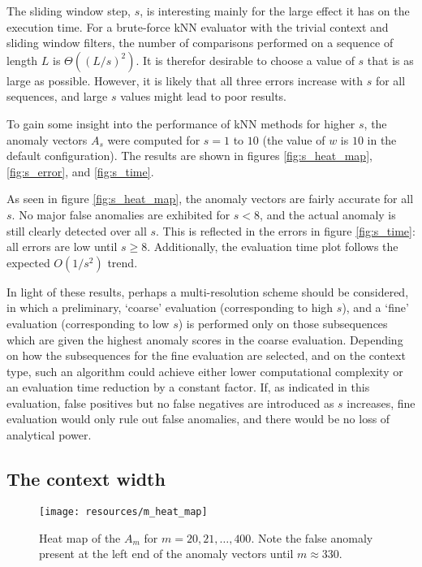 The sliding window step, $s$, is interesting mainly for the large effect it has on the execution time. For a brute-force kNN evaluator with the trivial context and sliding window filters, the number of comparisons performed on a sequence of length $L$ is $\Theta((L/s)^2)$. It is therefor desirable to choose a value of $s$ that is as large as possible. However, it is likely that all three errors increase with $s$ for all sequences, and large $s$ values might lead to poor results.

To gain some insight into the performance of kNN methods for higher $s$, the anomaly vectors $A_s$ were computed for $s = 1$ to $10$ (the value of $w$ is $10$ in the default configuration). The results are shown in figures \ref{fig:s_heat_map}, \ref{fig:s_error}, and \ref{fig:s_time}.

As seen in figure \ref{fig:s_heat_map}, the anomaly vectors are fairly accurate for all $s$. No major false anomalies are exhibited for $s < 8$, and the actual anomaly is still clearly detected over all $s$. This is reflected in the errors in figure \ref{fig:s_time}: all errors are low until $s \geq 8$. Additionally, the evaluation time plot follows the expected $O(1/s^2)$ trend.

In light of these results, perhaps a multi-resolution scheme should be considered, in which a preliminary, `coarse' evaluation (corresponding to high $s$), and a `fine' evaluation (corresponding to low $s$) is performed only on those subsequences which are given the highest anomaly scores in the coarse evaluation. Depending on how the subsequences for the fine evaluation are selected, and on the context type, such an algorithm could achieve either lower computational complexity or an evaluation time reduction by a constant factor. If, as indicated in this evaluation, false positives but no false negatives are introduced as $s$ increases, fine evaluation would only rule out false anomalies, and there would be no loss of analytical power. 

\subsection{The context width}
\FloatBarrier
\label{sect:m}

\begin{figure}[H]
    \vspace{-15pt}
    \begin{center}
        \texttt{[image: resources/m\_heat\_map]}
    \end{center}
    \vspace{-20pt}
    \caption{\small{Heat map of the $A_m$ for $m = 20, 21, \dots, 400$. Note the false anomaly present at the left end of the anomaly vectors until $m \approx 330$.}}
    \vspace{-10pt}
    \label{fig:m_heat_map}
\end{figure}

